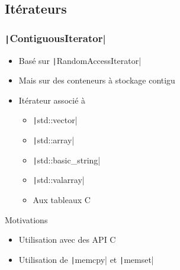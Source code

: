 \documentclass[C++.tex]{subfiles}
\begin{document}
\subsection*{Itérateurs}
\begin{frame}
	\frametitle{\texttt|ContiguousIterator|}
	\begin{itemize}
		\item Basé sur \texttt|RandomAccessIterator|
		\item Mais sur des conteneurs à stockage contigu
		\item Itérateur associé à
		\begin{itemize}
			\item \texttt|std::vector|
			\item \texttt|std::array|
			\item \texttt|std::basic_string|
			\item \texttt|std::valarray|
			\item Aux tableaux C
		\end{itemize}
	\end{itemize}

	\begin{block}{Motivations}
		\begin{itemize}
			\item Utilisation avec des API C
			\item Utilisation  de \texttt|memcpy| et \texttt|memset|
		\end{itemize}
	\end{block}

\end{frame}
\end{document}
